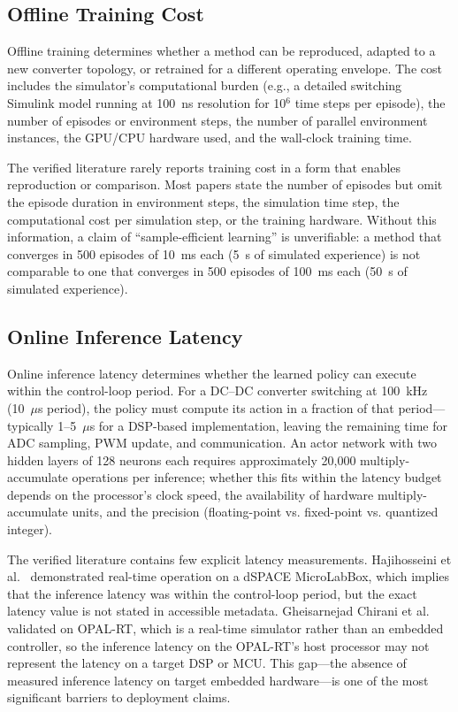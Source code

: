 \documentclass[manuscript,screen,review]{acmart}
\begin{document}
\subsection{Offline Training Cost}

Offline training determines whether a method can be reproduced, adapted to a new converter topology, or retrained for a different operating envelope.
The cost includes the simulator's computational burden (e.g., a detailed switching Simulink model running at 100~ns resolution for 10$^6$ time steps per episode), the number of episodes or environment steps, the number of parallel environment instances, the GPU/CPU hardware used, and the wall-clock training time.

The verified literature rarely reports training cost in a form that enables reproduction or comparison.
Most papers state the number of episodes but omit the episode duration in environment steps, the simulation time step, the computational cost per simulation step, or the training hardware.
Without this information, a claim of ``sample-efficient learning'' is unverifiable: a method that converges in 500 episodes of 10~ms each (5~s of simulated experience) is not comparable to one that converges in 500 episodes of 100~ms each (50~s of simulated experience).

\subsection{Online Inference Latency}

Online inference latency determines whether the learned policy can execute within the control-loop period.
For a DC--DC converter switching at 100~kHz (10~$\mu$s period), the policy must compute its action in a fraction of that period---typically 1--5~$\mu$s for a DSP-based implementation, leaving the remaining time for ADC sampling, PWM update, and communication.
An actor network with two hidden layers of 128 neurons each requires approximately 20,000 multiply-accumulate operations per inference; whether this fits within the latency budget depends on the processor's clock speed, the availability of hardware multiply-accumulate units, and the precision (floating-point vs. fixed-point vs. quantized integer).

The verified literature contains few explicit latency measurements.
Hajihosseini et al.~\cite{hajihosseini2020dc} demonstrated real-time operation on a dSPACE MicroLabBox, which implies that the inference latency was within the control-loop period, but the exact latency value is not stated in accessible metadata.
Gheisarnejad Chirani et al.~\cite{gheisarnejad2022reducing} validated on OPAL-RT, which is a real-time simulator rather than an embedded controller, so the inference latency on the OPAL-RT's host processor may not represent the latency on a target DSP or MCU.
This gap---the absence of measured inference latency on target embedded hardware---is one of the most significant barriers to deployment claims.
\end{document}
